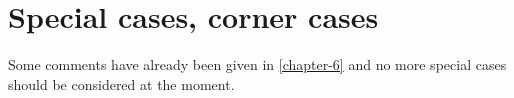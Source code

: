\section{Special cases, corner cases}
Some comments have already been given in \ref{chapter-6} and no more special cases should be considered at the moment.
